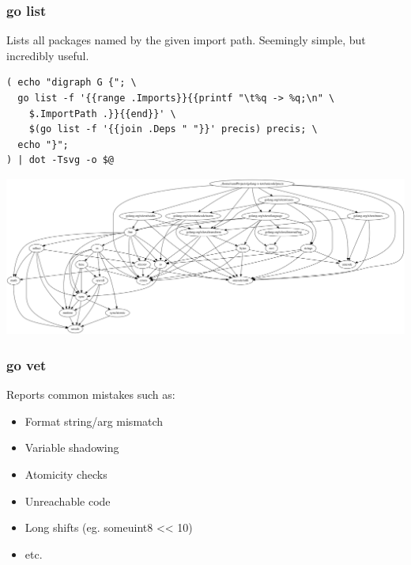 \documentclass[xelatex,aspectratio=169]{beamer}
\begin{document}
\begin{frame}[fragile]
	\frametitle{go list}
	\begin{flushleft}
		Lists all packages named by the given import path. Seemingly simple, but
		incredibly useful.
	\end{flushleft}
\begin{verbatim}
( echo "digraph G {"; \
  go list -f '{{range .Imports}}{{printf "\t%q -> %q;\n" \
    $.ImportPath .}}{{end}}' \
    $(go list -f '{{join .Deps " "}}' precis) precis; \
  echo "}";
) | dot -Tsvg -o $@
\end{verbatim}
\end{frame}

\begin{frame}
\centerline{\includegraphics[width=\textwidth]{images/deps.svg.png}}
\end{frame}

\begin{frame}
	\frametitle{go vet}
	\begin{flushleft}
		Reports common mistakes such as:
	\end{flushleft}
	\begin{itemize}[<+(1)->]
		\item Format string/arg mismatch
		\item Variable shadowing
		\item Atomicity checks
		\item Unreachable code
		\item Long shifts (eg. someuint8 << 10)
		\item etc.
	\end{itemize}
\end{frame}
\end{document}
